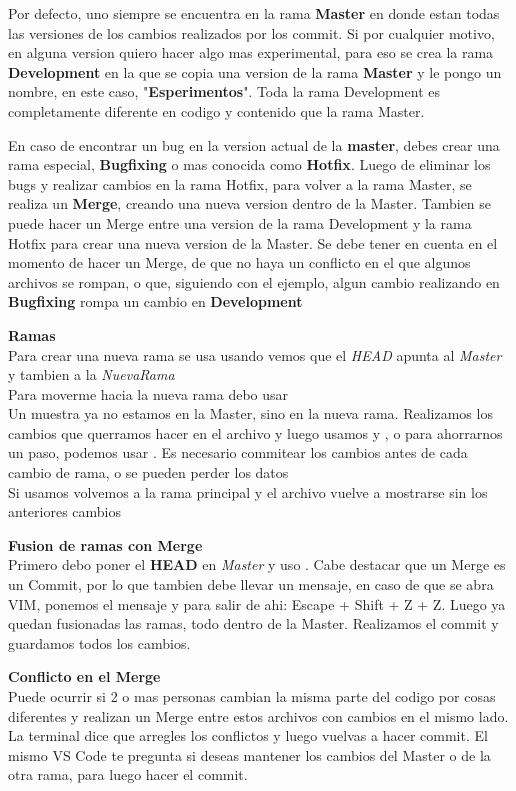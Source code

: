 \documentclass[]{article} %
\begin{document}
Por defecto, uno siempre se encuentra en la rama \textbf{Master} en donde estan todas las versiones de los cambios realizados por los commit. Si por cualquier motivo, en alguna version quiero hacer algo mas experimental, para eso se crea la rama \textbf{Development} en la que se copia una version de la rama \textbf{Master} y le pongo un nombre, en este caso, "\textbf{Esperimentos}". Toda la rama Development es completamente diferente en codigo y contenido que la rama Master.

En caso de encontrar un bug en la version actual de la \textbf{master}, debes crear una rama especial, \textbf{Bugfixing} o mas conocida como \textbf{Hotfix}. Luego de eliminar los bugs y realizar cambios en la rama Hotfix, para volver a la rama Master, se realiza un \textbf{Merge}, creando una nueva version dentro de la Master. Tambien se puede hacer un Merge entre una version de la rama Development y la rama Hotfix para crear una nueva version de la Master.
Se debe tener en cuenta en el momento de hacer un Merge, de que no haya un conflicto en el que algunos archivos se rompan, o que, siguiendo con el ejemplo, algun cambio realizando en \textbf{Bugfixing} rompa un cambio en \textbf{Development}

\pagebreak
\textbf{Ramas}\\
Para crear una nueva rama se usa 
usando  vemos que el \textit{HEAD} apunta al \textit{Master} y tambien a la \textit{NuevaRama}\\
Para moverme hacia la nueva rama debo usar \\ 
Un  muestra ya no estamos en la Master, sino en la nueva rama. Realizamos los cambios que querramos hacer en el archivo y luego usamos  y , o para ahorrarnos un paso, podemos usar . Es necesario commitear los cambios antes de cada cambio de rama, o se pueden perder los datos\\ 
Si usamos  volvemos a la rama principal y el archivo vuelve a mostrarse sin los anteriores cambios

\textbf{Fusion de ramas con Merge}\\ 
Primero debo poner el \textbf{HEAD} en \textit{Master} y uso . Cabe destacar que un Merge es un Commit, por lo que tambien debe llevar un mensaje, en caso de que se abra VIM, ponemos el mensaje y para salir de ahi: Escape + Shift + Z + Z.
Luego ya quedan fusionadas las ramas, todo dentro de la Master. Realizamos el commit y guardamos todos los cambios.

\textbf{Conflicto en el Merge}\\
Puede ocurrir si 2 o mas personas cambian la misma parte del codigo por cosas diferentes y realizan un Merge entre estos archivos con cambios en el mismo lado.
La terminal dice que arregles los conflictos y luego vuelvas a hacer commit. El mismo VS Code te pregunta si deseas mantener los cambios del Master o de la otra rama, para luego hacer el commit.
\end{document}
